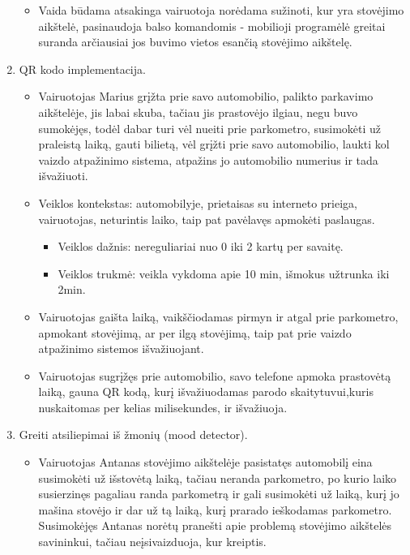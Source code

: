 \documentclass{VUMIFPSkursinis}
\begin{document}
\begin{enumerate}[label = \textbf{PV\arabic*.}]
\begin{itemize}[label={-}]
			\item Vaida būdama atsakinga vairuotoja norėdama sužinoti, kur yra stovėjimo aikštelė, pasinaudoja balso komandomis - mobilioji programėlė greitai suranda arčiausiai jos buvimo vietos esančią stovėjimo aikštelę. 
			
		\end{itemize}
	\item QR kodo implementacija.
		\begin{itemize}[label={-}]
			\item Vairuotojas Marius grįžta prie savo automobilio, palikto parkavimo aikštelėje, jis labai skuba, tačiau jis prastovėjo ilgiau, negu buvo sumokėjęs, todėl dabar turi vėl nueiti prie parkometro, susimokėti už praleistą laiką, gauti bilietą, vėl grįžti prie savo automobilio, laukti kol vaizdo atpažinimo sistema, atpažins jo automobilio numerius ir tada išvažiuoti.

			\item Veiklos kontekstas: automobilyje, prietaisas su interneto prieiga, vairuotojas, neturintis laiko, taip pat pavėlavęs apmokėti paslaugas.
				\begin{itemize}[label={$\bullet$}]
					\item Veiklos dažnis: nereguliariai nuo 0 iki 2 kartų per savaitę.
					\item Veiklos trukmė: veikla vykdoma apie 10 min, išmokus užtrunka iki 2min.
				\end{itemize}
			\item Vairuotojas gaišta laiką, vaikščiodamas pirmyn ir atgal prie parkometro, apmokant stovėjimą, ar per ilgą stovėjimą, taip pat prie vaizdo atpažinimo sistemos išvažiuojant.

			\item Vairuotojas sugrįžęs prie automobilio, savo telefone apmoka prastovėtą laiką, gauna QR kodą, kurį išvažiuodamas parodo skaitytuvui,kuris nuskaitomas per kelias milisekundes, ir išvažiuoja.
			
		\end{itemize}
	\item Greiti atsiliepimai iš žmonių (mood detector).
		\begin{itemize}[label={-}]
			\item Vairuotojas Antanas stovėjimo aikštelėje pasistatęs automobilį eina susimokėti už išstovėtą laiką, tačiau neranda parkometro, po kurio laiko susierzinęs pagaliau randa parkometrą ir gali susimokėti už laiką, kurį jo mašina stovėjo ir dar už tą laiką, kurį prarado ieškodamas parkometro. Susimokėjęs Antanas norėtų pranešti apie problemą stovėjimo aikštelės savininkui, tačiau neįsivaizduoja, kur kreiptis.


\end{itemize}
\end{enumerate}
\end{document}
